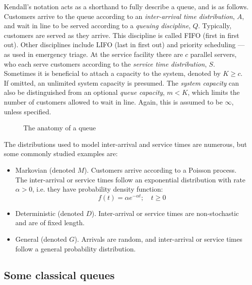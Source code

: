 Kendall's notation acts as a shorthand to fully describe a queue, and is as
follows. Customers arrive to the queue according to an \emph{inter-arrival time
distribution}, \(A\), and wait in line to be served according to a \emph{queuing
discipline}, \(Q\). Typically, customers are served as they arrive. This
discipline is called FIFO (first in first out). Other disciplines include LIFO
(last in first out) and priority scheduling --- as used in emergency triage. At
the service facility there are \(c\) parallel servers, who each serve customers
according to the \emph{service time distribution}, \(S\). Sometimes it is
beneficial to attach a capacity to the system, denoted by \(K \ge c\). If
omitted, an unlimited system capacity is presumed. The \emph{system capacity}
can also be distinguished from an optional \emph{queue capacity}, \(m < K\),
which limits the number of customers allowed to wait in line. Again, this is
assumed to be \(\infty\), unless specified.

\begin{figure}[htbp]
    \centering%
    \resizebox{\imgwidth}{!}{%
        
    }\caption{The anatomy of a queue}\label{fig:queue}
\end{figure}

The distributions used to model inter-arrival and service times are numerous,
but some commonly studied examples are:

\begin{itemize}
    \item Markovian (denoted \(M\)). Customers arrive according to a Poisson
        process. The inter-arrival or service times follow an exponential
        distribution with rate \(\alpha > 0\), i.e. they have probability
        density function:
        \begin{equation}\label{eq:exponential}
            f(t) = \alpha e^{-\alpha t}; \quad t \ge 0
        \end{equation}
    \item Deterministic (denoted \(D\)). Inter-arrival or service times are
        non-stochastic and are of fixed length.
    \item General (denoted \(G\)). Arrivals are random, and inter-arrival or
        service times follow a general probability distribution.
\end{itemize}

\subsection{Some classical queues}\label{subsec:known}

